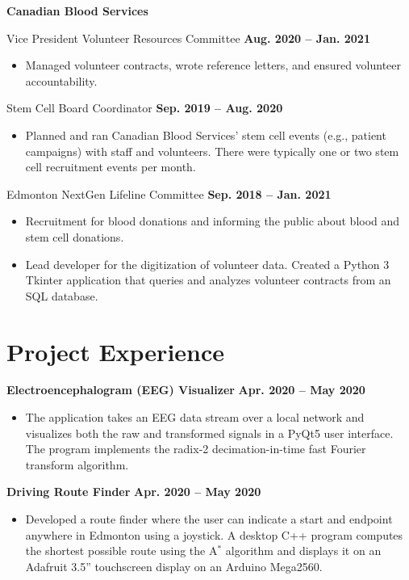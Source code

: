 \documentclass{article}
\begin{document}
\textbf{Canadian Blood Services}

Vice President Volunteer Resources Committee \hfill \textbf{Aug. 2020 -- Jan. 2021}
\begin{itemize}
    \item Managed volunteer contracts, wrote reference letters, and ensured volunteer accountability.
\end{itemize}

Stem Cell Board Coordinator \hfill \textbf{Sep. 2019 -- Aug. 2020}
\begin{itemize}
    \item Planned and ran Canadian Blood Services' stem cell events (e.g., patient campaigns) with staff and volunteers. There were typically one or two stem cell recruitment events per month.
\end{itemize}

Edmonton NextGen Lifeline Committee \hfill \textbf{Sep. 2018 -- Jan. 2021}
\begin{itemize}
    \item Recruitment for blood donations and informing the public about blood and stem cell donations.
    \item Lead developer for the digitization of volunteer data. Created a Python 3 Tkinter application that queries and analyzes volunteer contracts from an SQL database.
\end{itemize}



\section*{\textcolor{my_colour}{Project Experience}}
\vspace{-.25em} \hrulefill \vspace{.75em}

\textbf{Electroencephalogram (EEG) Visualizer} \hfill \textbf{Apr. 2020 -- May 2020}
\begin{itemize}
    \item The application takes an EEG data stream over a local network and visualizes both the raw and transformed signals in a PyQt5 user interface. The program implements the radix-2 decimation-in-time fast Fourier transform algorithm.
\end{itemize}

\textbf{Driving Route Finder} \hfill \textbf{Apr. 2020 -- May 2020}
\begin{itemize}
    \item Developed a route finder where the user can indicate a start and endpoint anywhere in Edmonton using a joystick. A desktop C++ program computes the shortest possible route using the A$^*$ algorithm and displays it on an Adafruit 3.5'' touchscreen display on an Arduino Mega2560.
\end{itemize}
\end{document}
